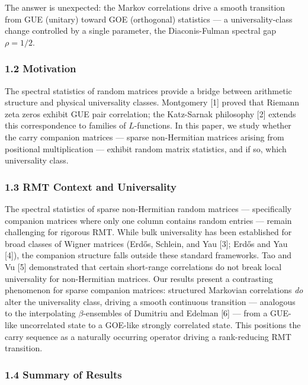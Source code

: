 \documentclass[
  11pt,
]{article}
\begin{document}
The answer is unexpected: the Markov correlations drive a smooth transition from
GUE (unitary) toward GOE (orthogonal) statistics --- a universality-class change
controlled by a single parameter, the Diaconis-Fulman spectral gap
\(\rho = 1/2\).

\subsubsection{1.2 Motivation}\label{motivation}

The spectral statistics of random matrices provide a bridge between arithmetic
structure and physical universality classes. Montgomery {[}1{]} proved that
Riemann zeta zeros exhibit GUE pair correlation; the Katz-Sarnak philosophy
{[}2{]} extends this correspondence to families of \(L\)-functions. In this
paper, we study whether the carry companion matrices --- sparse non-Hermitian
matrices arising from positional multiplication --- exhibit random matrix
statistics, and if so, which universality class.

\subsubsection{1.3 RMT Context and
Universality}\label{rmt-context-and-universality}

The spectral statistics of sparse non-Hermitian random matrices --- specifically
companion matrices where only one column contains random entries --- remain
challenging for rigorous RMT. While bulk universality has been established for
broad classes of Wigner matrices (Erdős, Schlein, and Yau {[}3{]}; Erdős and Yau
{[}4{]}), the companion structure falls outside these standard frameworks. Tao
and Vu {[}5{]} demonstrated that certain short-range correlations do not break
local universality for non-Hermitian matrices. Our results present a contrasting
phenomenon for sparse companion matrices: structured Markovian correlations
\emph{do} alter the universality class, driving a smooth continuous transition
--- analogous to the interpolating \(\beta\)-ensembles of Dumitriu and Edelman
{[}6{]} --- from a GUE-like uncorrelated state to a GOE-like strongly correlated
state. This positions the carry sequence as a naturally occurring operator
driving a rank-reducing RMT transition.

\subsubsection{1.4 Summary of Results}\label{summary-of-results}
\end{document}
